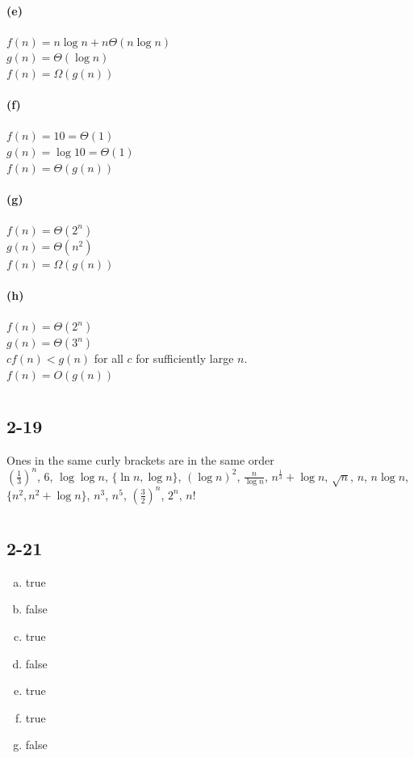 \documentclass[letter]{article}
\begin{document}
\paragraph*{(e)}
$f(n) = n \log n + n \Theta(n\log n)$\\
$g(n) = \Theta(\log n)$\\
$f(n) = \Omega(g(n))$

\paragraph*{(f)}
$f(n) = 10 = \Theta(1)$\\
$g(n) = \log 10 = \Theta(1)$\\
$f(n) = \Theta(g(n))$

\paragraph*{(g)}
$f(n) = \Theta(2^n)$\\
$g(n) = \Theta(n^2)$\\
$f(n) = \Omega(g(n))$

\paragraph*{(h)}
$f(n) = \Theta(2^n)$\\
$g(n) = \Theta(3^n)$\\
$cf(n)<g(n)$ for all $c$ for sufficiently large $n$.\\
$f(n) = O(g(n))$
\newpage

\section{}
\subsection*{2-19}
Ones in the same curly brackets are in the same order\\
$(\frac{1}{3})^n$,
$6$,
$\log \log n$,
$\{\ln n,\log n\}$,
$(\log n)^2$,
$\frac{n}{\log n}$,
$n^{\frac{1}{3}} + \log n$,
$\sqrt{n}$,
$n$,
$n\log n$,
$\{n^2,n^2 + \log n\}$,
$n^3$,
$n^5$,
$(\frac{3}{2})^n$,
$2^n$,
$n!$

\newpage
\section{}
\subsection*{2-21}
\begin{enumerate}[(a)]
 \item true
 \item false
 \item true
 \item false
 \item true
 \item true
 \item false
\end{enumerate}
\end{document}
